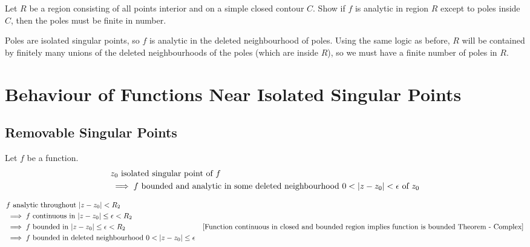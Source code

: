 \documentclass[12pt, english]{book}
\makeatletter
\renewenvironment{proof}[1][\proofname]{\par
	\pushQED{\qed}%
	\normalfont \topsep6\p@\@plus6\p@\relax
	\list{}{%
		\settowidth{\leftmargin}{\itshape\proofname:\hskip\labelsep}%
		\setlength{\labelwidth}{0pt}%
		\setlength{\itemindent}{-\leftmargin}%
		}%
	\item[\hskip\labelsep\itshape#1\@addpunct{:}]\ignorespaces
	}{\popQED\endlist\@endpefalse}
\makeatother
\begin{document}
	\begin{example}
		\label{Isolated zeros implies finite poles in analytic region Example - Complex}
		Let \(R\) be a region consisting of all points interior and on a simple closed contour \(C\). Show if \(f\) is analytic in region \(R\) except to poles inside \(C\), then the poles must be finite in number. 
	\end{example}
	\begin{proof}
		{\color{Grey}
		Poles are isolated singular points, so \(f\) is analytic in the deleted neighbourhood of poles. Using the same logic as before, \(R\) will be contained by finitely many unions of the deleted neighbourhoods of the poles (which are inside \(R\)), so we must have a finite number of poles in \(R\).
		}
	\end{proof}


	\section{Behaviour of Functions Near Isolated Singular Points} \label{Behaviour of Functions Near Isolated Singular Points Section - Complex}
	
	\subsection{Removable Singular Points}
	
	\begin{theorem}
		Let \(f\) be a function.
		\begin{align*}
			&z_0 \text{ isolated singular point of } f \\
			&\implies f \text{ bounded and analytic in some deleted neighbourhood } 0<\abs{z-z_0}<\epsilon \text{ of } z_0
		\end{align*}
	\end{theorem}
	\begin{proof}
		\begin{align*}
			&f \text{ analytic throughout } \abs{z-z_0}<R_2 \\
			&\implies f \text{ continuous in } \abs{z-z_0}\leq\epsilon<R_2 \\
			&\implies f \text{ bounded in } \abs{z-z_0}\leq\epsilon<R_2 
				&\text{\Cref{Function continuous in closed and bounded region implies function is bounded Theorem - Complex}}\\
			&\implies f \text{ bounded in deleted neighbourhood } 0<\abs{z-z_0}\leq\epsilon
		\end{align*}
	\end{proof}
\end{document}
